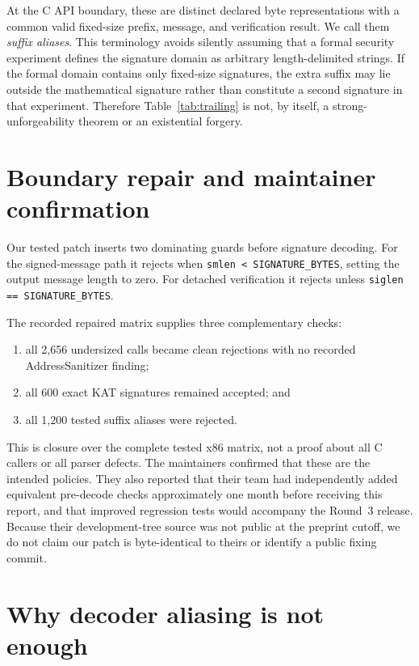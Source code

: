 \documentclass[11pt]{article}
\newcommand{\code}[1]{\texttt{#1}}
\begin{document}
At the C API boundary, these are distinct declared byte representations with a
common valid fixed-size prefix, message, and verification result.  We call
them \emph{suffix aliases}.  This terminology avoids silently assuming that a
formal security experiment defines the signature domain as arbitrary
length-delimited strings.  If the formal domain contains only fixed-size
signatures, the extra suffix may lie outside the mathematical signature rather
than constitute a second signature in that experiment.  Therefore
Table~\ref{tab:trailing} is not, by itself, a strong-unforgeability theorem or
an existential forgery.

\section{Boundary repair and maintainer confirmation}

Our tested patch inserts two dominating guards before signature decoding.
For the signed-message path it rejects when
\code{smlen < SIGNATURE\_BYTES}, setting the output message length to zero.
For detached verification it rejects unless
\code{siglen == SIGNATURE\_BYTES}.

The recorded repaired matrix supplies three complementary checks:

\begin{enumerate}
  \item all 2,656 undersized calls became clean rejections with no recorded
        AddressSanitizer finding;
  \item all 600 exact KAT signatures remained accepted; and
  \item all 1,200 tested suffix aliases were rejected.
\end{enumerate}

This is closure over the complete tested x86 matrix, not a proof about all C
callers or all parser defects.  The maintainers confirmed that these are the
intended policies.  They also reported that their team had independently added
equivalent pre-decode checks approximately one month before receiving this
report, and that improved regression tests would accompany the Round~3
release.  Because their development-tree source was not public at the preprint
cutoff, we do not claim our patch is byte-identical to theirs or identify a
public fixing commit.

\section{Why decoder aliasing is not enough}
\end{document}
